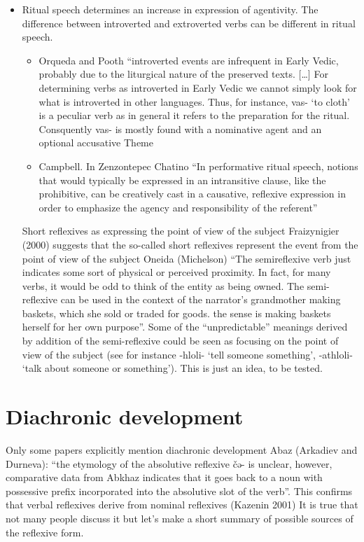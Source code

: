 \documentclass[output=paper]{langsci/langscibook}
\begin{document}
\begin{itemize}
\begin{itemize}
\begin{itemize}
\end{itemize}
\item Ritual speech determines an increase in expression of agentivity. The difference between introverted and extroverted verbs can be different in ritual speech. 
\begin{itemize}
    \item Orqueda and Pooth “introverted events are infrequent in Early Vedic, probably due to the liturgical nature of the preserved texts. […] For determining verbs as introverted in Early Vedic we cannot simply look for what is introverted in other languages. Thus, for instance, vas- ‘to cloth’ is a peculiar verb as in general it refers to the preparation for the ritual. Consquently vas- is mostly found with a nominative agent and an optional accusative Theme
\item Campbell. In Zenzontepec Chatino “In performative ritual speech, notions that would typically be expressed in an intransitive clause, like the prohibitive, can be creatively cast in a causative, reflexive expression in order to emphasize the agency and responsibility of the referent”
\end{itemize}

Short reflexives as expressing the point of view of the subject 
Fraizynigier (2000) suggests that the so-called short reflexives represent the event from the point of view of the subject
Oneida (Michelson) “The semireflexive verb just indicates some sort of physical or perceived proximity. In fact, for many verbs, it would be odd to think of the entity as being owned. The semi-reflexive can be used in the context of the narrator’s grandmother making baskets, which she sold or traded for goods. the sense is making baskets herself for her own purpose”. Some of the “unpredictable” meanings derived by addition of the semi-reflexive could be seen as focusing on the point of view of the subject (see for instance -hloli- ‘tell someone something’, -athloli- ‘talk about someone or something’). This is just an idea, to be tested.
\end{itemize}
\end{itemize}

\section{Diachronic development}

Only some papers explicitly mention diachronic development
Abaz (Arkadiev and Durneva): “the etymology of the absolutive reflexive čə- is unclear, however, comparative data from Abkhaz  indicates that it goes back to a noun with possessive prefix incorporated into the absolutive slot of the verb”. This confirms that verbal reflexives derive from nominal reflexives (Kazenin 2001)
It is true that not many people discuss it but let’s make a short summary of possible sources of the reflexive form.
\end{document}
